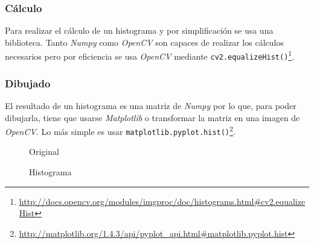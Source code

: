 \subsubsection{Cálculo}
Para realizar el cálculo de un histograma y por simplificación se usa
una biblioteca. Tanto \emph{Numpy} como \emph{OpenCV} son capaces de
realizar los cálculos necesarios pero por eficiencia se usa
\emph{OpenCV} mediante
\texttt{cv2.equalizeHist()}\footnote{\url{http://docs.opencv.org/modules/imgproc/doc/histograms.html\#cv2.equalizeHist}}.

\subsubsection{Dibujado}
El resultado de un histograma es una matriz de \emph{Numpy} por lo
que, para poder dibujarla, tiene que usarse \emph{Matplotlib} o
transformar la matriz en una imagen de \emph{OpenCV}. Lo más simple es
usar
\texttt{matplotlib.pyplot.hist()}\footnote{\url{http://matplotlib.org/1.4.3/api/pyplot_api.html\#matplotlib.pyplot.hist}}.

\begin{figure}[H]
  \caption{Original}
  \centering \setlength\fboxsep{0pt} \setlength\fboxrule{0.5pt}
\end{figure}

\begin{figure}[H]
  \caption{Histograma}
  \centering \setlength\fboxsep{0pt} \setlength\fboxrule{0.5pt}
\end{figure}

